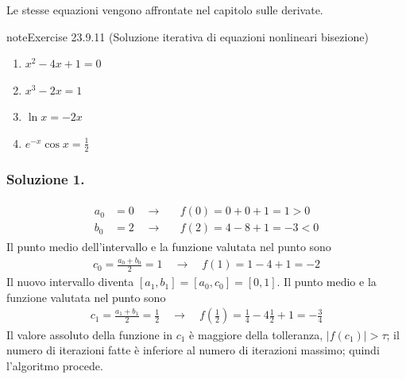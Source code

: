 \documentclass[letterpaper,10pt,italian]{jupyterBook}
\begin{document}
\sphinxAtStartPar
Le stesse equazioni vengono affrontate {\hyperref[\detokenize{ch/infinitesimal_calculus/derivatives-problems:infinitesimal-calculus-derivatives-problems-newton}]{}} nel capitolo sulle derivate.
 \label{exercise:ch/infinitesimal_calculus/analysis-problems-exercise-10}

\begin{sphinxadmonition}{note}{Exercise 23.9.11 (Soluzione iterativa di equazioni nonlineari \sphinxhyphen{} bisezione)}


\begin{enumerate}
%
\item {} 
\sphinxAtStartPar
\(x^2 - 4x + 1 = 0 \)

\item {} 
\sphinxAtStartPar
\(x^3 - 2x = 1\)

\item {} 
\sphinxAtStartPar
\(\ln x = - 2 x\)

\item {} 
\sphinxAtStartPar
\(e^{-x} \cos x = \frac{1}{2}\)

\end{enumerate}
\end{sphinxadmonition}
\subsubsection*{Soluzione 1.}

\sphinxAtStartPar
{}
\begin{equation*}
\begin{split}\begin{aligned}
  a_0 & = 0 \quad \rightarrow && f(0) = 0 + 0 + 1 =  1 > 0 \\
  b_0 & = 2 \quad \rightarrow && f(2) = 4 - 8 + 1 = -3 < 0
\end{aligned}\end{split}
\end{equation*}
\sphinxAtStartPar
{} Il punto medio dell’intervallo e la funzione valutata nel punto sono
\begin{equation*}
\begin{split}c_0 = \frac{a_0+b_0}{2} = 1 \quad \rightarrow \quad f(1) = 1 - 4 + 1 = -2\end{split}
\end{equation*}
\sphinxAtStartPar
{} Il nuovo intervallo diventa \([a_1, b_1] = [a_0, c_0] = [0, 1]\). Il punto medio e la funzione valutata nel punto sono
\begin{equation*}
\begin{split}c_1 = \frac{a_1 + b_1}{2} = \frac{1}{2} \quad \rightarrow \quad f\left(\frac{1}{2}\right) = \frac{1}{4} - 4 \frac{1}{2} + 1 = -\frac{3}{4} \end{split}
\end{equation*}
\sphinxAtStartPar
Il valore assoluto della funzione in \(c_1\) è maggiore della tolleranza, \(|f(c_1)| > \tau\); il numero di iterazioni fatte è inferiore al numero di iterazioni massimo; quindi l’algoritmo procede.
\end{document}
